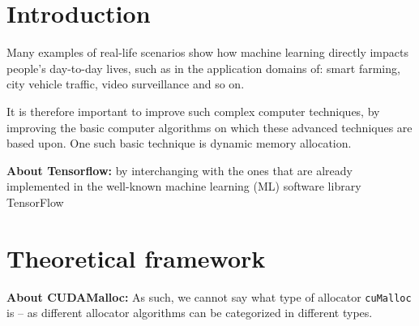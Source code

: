 \documentclass[12pt]{article}
\begin{document}
\section{Introduction}
Many examples of real-life scenarios show how machine learning directly impacts people's day-to-day lives, such as in the application domains of: smart farming\todo[inline]{[1 TODO]}, city vehicle traffic\todo[inline]{[2 TODO]}, video surveillance and so on. 

It is therefore important to improve such complex computer techniques, by improving the basic computer algorithms on which these advanced techniques are based upon. One such basic technique is dynamic memory allocation.

\textbf{About Tensorflow:} by interchanging with the ones that are already implemented in the well-known machine learning (ML) software library TensorFlow

\section{Theoretical framework}

\textbf{About CUDAMalloc:} As such, we cannot say what type of allocator \texttt{cuMalloc} is -- as different allocator algorithms can be categorized in different types.
\end{document}
